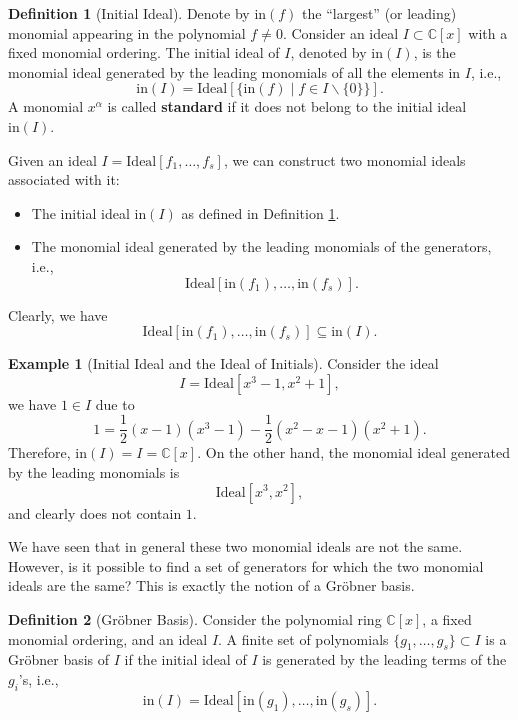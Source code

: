 \documentclass[
]{book}
\theoremstyle{definition}
\newtheorem{definition}{Definition}[chapter]
\theoremstyle{definition}
\newtheorem{example}{Example}[chapter]
\theoremstyle{definition}
\theoremstyle{definition}
\theoremstyle{remark}
\begin{document}
\begin{definition}[Initial Ideal]
\protect\hypertarget{def:InitialIdeal}{}\label{def:InitialIdeal}Denote by \(\mathrm{in}(f)\) the ``largest'' (or leading) monomial appearing in the polynomial \(f\neq 0\). Consider an ideal \(I \subset \mathbb{C}[x]\) with a fixed monomial ordering. The initial ideal of \(I\), denoted by \(\mathrm{in}(I)\), is the monomial ideal generated by the leading monomials of all the elements in \(I\), i.e.,
\[
\mathrm{in}(I) = \mathrm{Ideal}[\{ \mathrm{in}(f) \mid f \in I \backslash \{0\} \}].
\]
A monomial \(x^\alpha\) is called \textbf{standard} if it does not belong to the initial ideal \(\mathrm{in}(I)\).
\end{definition}

Given an ideal \(I = \mathrm{Ideal}[f_1,\dots,f_s]\), we can construct two monomial ideals associated with it:

\begin{itemize}
\item
  The initial ideal \(\mathrm{in}(I)\) as defined in Definition \ref{def:InitialIdeal}.
\item
  The monomial ideal generated by the leading monomials of the generators, i.e.,
  \[
  \mathrm{Ideal}[\mathrm{in}(f_1),\dots,\mathrm{in}(f_s)].
  \]
\end{itemize}

Clearly, we have
\[
\mathrm{Ideal}[\mathrm{in}(f_1),\dots,\mathrm{in}(f_s)] \subseteq \mathrm{in}(I).
\]

\begin{example}[Initial Ideal and the Ideal of Initials]
\protect\hypertarget{exm:InitialIdeal}{}\label{exm:InitialIdeal}Consider the ideal
\[
I = \mathrm{Ideal}[x^3 -1, x^2 + 1],
\]
we have \(1 \in I\) due to
\[
1 = \frac{1}{2}(x-1)(x^3 - 1) - \frac{1}{2}(x^2 - x - 1)(x^2 +1).
\]
Therefore, \(\mathrm{in}(I) = I = \mathbb{C}[x]\). On the other hand, the monomial ideal generated by the leading monomials is
\[
\mathrm{Ideal}[x^3, x^2],
\]
and clearly does not contain \(1\).
\end{example}

We have seen that in general these two monomial ideals are not the same. However, is it possible to find a set of generators for which the two monomial ideals are the same? This is exactly the notion of a Gröbner basis.

\begin{definition}[Gröbner Basis]
\protect\hypertarget{def:GrobnerBasis}{}\label{def:GrobnerBasis}Consider the polynomial ring \(\mathbb{C}[x]\), a fixed monomial ordering, and an ideal \(I\). A finite set of polynomials \(\{ g_1,\dots,g_s \} \subset I\) is a Gröbner basis of \(I\) if the initial ideal of \(I\) is generated by the leading terms of the \(g_i\)'s, i.e.,
\[
\mathrm{in}(I) = \mathrm{Ideal}[\mathrm{in}(g_1),\dots,\mathrm{in}(g_s)].
\]
\end{definition}
\end{document}
